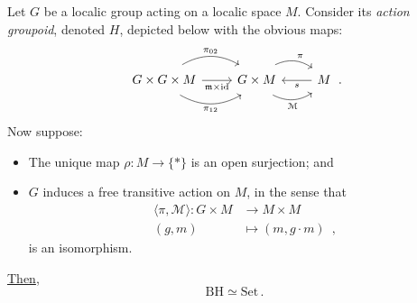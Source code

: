 \documentclass[a4paper, 11pt,reqno]{amsart}
\newcommand{\Set}{\mathrm{Set}}
\newcommand{\id}{\mathrm{id}}
\newcommand{\M}{\mathcal{M}}
\newcommand{\m}{\mathfrak{m}}
\newcommand{\baseS}{\mathcal{S}}
\newcommand{\lranglet}[2]{\langle#1,#2\rangle}
\begin{document}
\begin{theorem}\label{thm:TRIVIALfreeTRANSaction} Let $G$ be a localic group acting on a localic space $M$. Consider its {\em action groupoid}, denoted $H$, depicted below with the obvious maps:
	\begin{equation}\label{eq:groupoidFREETRANSITIVE}
	\begin{tikzcd}  G\times G\times M \ar[r, bend right, shift right=1ex, swap, "\pi_{12}"] \ar[r,swap,"\m\times\id"] \ar[r,bend left, shift left=1ex,  "\pi_{02}"] & G\times M \ar[r, bend right,shift right=1ex, swap, "\M"] \ar[r, bend left, shift left=1ex, "\pi"] & M \ar[l, "s"] \end{tikzcd}\,.
	\end{equation}
Now suppose:
\begin{itemize}
	\item  The unique map $\rho\colon M\rightarrow \{*\}$ is an open surjection; and 
	\item $G$ induces a free transitive action on $M$, in the sense that 
\begin{align}\label{eq:free-trans-action}
\lranglet{\pi}{\M}\colon G\times M&\longrightarrow M\times M \\
(g,m)&\longmapsto(m,g\cdot m)\,\,\,, \nonumber 
\end{align}
	is an isomorphism.
\end{itemize}
\noindent \underline{Then},
$$\mathrm{BH}\simeq \Set\,.$$
\end{theorem}
\end{document}
